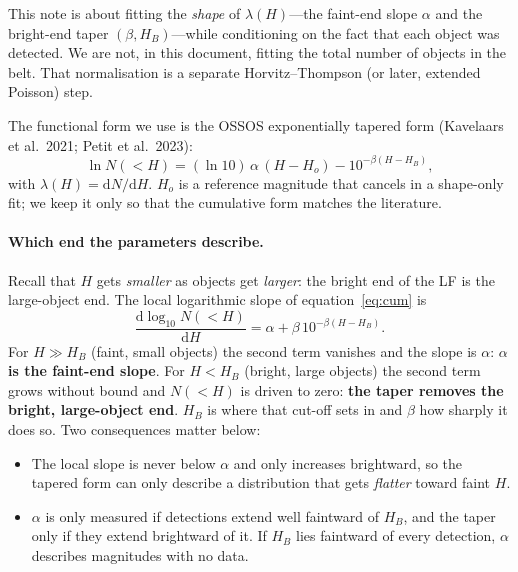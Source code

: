 \documentclass[11pt,a4paper]{article}
\begin{document}
This note is about fitting the \emph{shape} of $\lambda(H)$---the faint-end
slope $\alpha$ and the bright-end taper $(\beta, H_B)$---while conditioning
on the fact that each object was detected.  We are not, in this document,
fitting the total number of objects in the belt.  That normalisation is a
separate Horvitz--Thompson (or later, extended Poisson) step.

The functional form we use is the OSSOS exponentially tapered form
(Kavelaars et al.\ 2021; Petit et al.\ 2023):
\begin{equation}
  \ln N(<H)
  = (\ln 10)\,\alpha\,(H - H_o)
    - 10^{-\beta (H - H_B)},
  \label{eq:cum}
\end{equation}
with $\lambda(H) = \mathrm{d}N/\mathrm{d}H$.  $H_o$ is a reference magnitude
that cancels in a shape-only fit; we keep it only so that the cumulative form
matches the literature.

\paragraph{Which end the parameters describe.}
Recall that $H$ gets \emph{smaller} as objects get \emph{larger}: the bright
end of the LF is the large-object end.  The local logarithmic slope of
equation~\eqref{eq:cum} is
\begin{equation}
  \frac{\mathrm{d}\log_{10} N(<H)}{\mathrm{d}H}
  = \alpha + \beta\,10^{-\beta (H - H_B)} .
  \label{eq:slope}
\end{equation}
For $H \gg H_B$ (faint, small objects) the second term vanishes and the slope
is $\alpha$: \textbf{$\alpha$ is the faint-end slope}.  For $H < H_B$ (bright,
large objects) the second term grows without bound and $N(<H)$ is driven to
zero: \textbf{the taper removes the bright, large-object end}.  $H_B$ is where
that cut-off sets in and $\beta$ how sharply it does so.  Two consequences
matter below:
\begin{itemize}
  \item The local slope is never below $\alpha$ and only increases brightward,
  so the tapered form can only describe a distribution that gets
  \emph{flatter} toward faint $H$.
  \item $\alpha$ is only measured if detections extend well faintward of
  $H_B$, and the taper only if they extend brightward of it.  If $H_B$ lies
  faintward of every detection, $\alpha$ describes magnitudes with no data.
\end{itemize}

\end{document}
